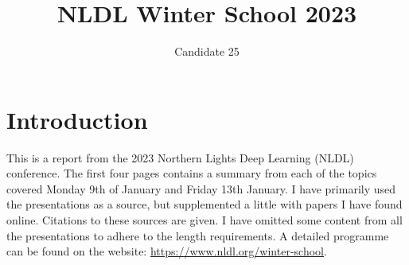 \documentclass[10pt,twocolumn,letterpaper]{article}
\begin{document}
\title{NLDL Winter School 2023}

\author{Candidate 25}
\maketitle

\section{Introduction} \label{sec:intro}
This is a report from the 2023 Northern Lights Deep Learning (NLDL) conference. The first four pages contains a summary from each of the topics covered Monday 9th of January and Friday 13th January. I have primarily used the presentations as a source, but supplemented a little with papers I have found online. Citations to these sources are given. 
I have omitted some content from all the presentations to adhere to the length requirements. A detailed programme can be found on the website: \href{https://www.nldl.org/winter-school}{https://www.nldl.org/winter-school}. 
\end{document}
